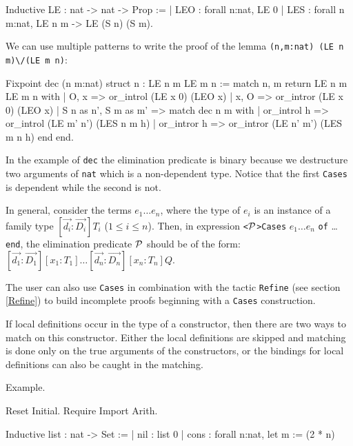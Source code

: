 \begin{coq_example}
Inductive LE : nat -> nat -> Prop :=
  | LEO : forall n:nat, LE 0%
  | LES : forall n m:nat, LE n m -> LE (S n) (S m).
\end{coq_example}

We can use multiple patterns to write  the proof of the lemma
 \texttt{(n,m:nat) (LE n m)}\verb=\/=\texttt{(LE m n)}:

\begin{coq_example}
Fixpoint dec (n m:nat) {struct n} : LE n m \/ LE m n :=
  match n, m return LE n m \/ LE m n with
  | O, x => or_introl (LE x 0) (LEO x)
  | x, O => or_intror (LE x 0) (LEO x)
  | S n as n', S m as m' =>
      match dec n m with
      | or_introl h => or_introl (LE m' n') (LES n m h)
      | or_intror h => or_intror (LE n' m') (LES m n h)
      end
  end.
\end{coq_example}
In the example of \texttt{dec} the elimination predicate is binary
because we destructure two arguments of \texttt{nat} which is a
non-dependent type. Notice that the first \texttt{Cases} is dependent while 
the second is not.

In general, consider the terms $e_1\ldots e_n$,
where  the type of $e_i$ is an instance of a family type
$[\vec{d_i}:\vec{D_i}]T_i$  ($1\leq i
\leq n$). Then, in expression \texttt{<}${\cal P}$\texttt{>Cases}  $e_1\ldots
e_n$ \texttt{of} \ldots \texttt{end}, the 
elimination predicate ${\cal P}$ should be of the form:
$[\vec{d_1}:\vec{D_1}][x_1:T_1]\ldots [\vec{d_n}:\vec{D_n}][x_n:T_n]Q.$

The user can also use \texttt{Cases} in combination with the tactic
\texttt{Refine} (see section \ref{Refine}) to build incomplete proofs
beginning with a \texttt{Cases} construction.


If local definitions occur in the type of a constructor, then there
are two ways to match on this constructor. Either the local
definitions are skipped and matching is done only on the true arguments
of the constructors, or the bindings for local definitions can also
be caught in the matching.

Example.

\begin{coq_eval}
Reset Initial.
Require Import Arith.
\end{coq_eval}

\begin{coq_example*}
Inductive list : nat -> Set :=
  | nil : list 0%
  | cons : forall n:nat, let m := (2 * n)%
\end{coq_example*}

